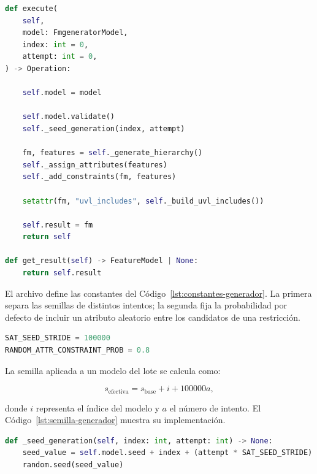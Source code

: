 \begin{lstlisting}[language=Python,
basicstyle=\ttfamily\footnotesize,breaklines=true,columns=fullflexible,
caption={Coordinación de la generación en \texttt{GenerateFeatureModel}.},
label={lst:execute-generador}]
def execute(
    self,
    model: FmgeneratorModel,
    index: int = 0,
    attempt: int = 0,
) -> Operation:

    self.model = model

    self.model.validate()
    self._seed_generation(index, attempt)

    fm, features = self._generate_hierarchy()
    self._assign_attributes(features)
    self._add_constraints(fm, features)

    setattr(fm, "uvl_includes", self._build_uvl_includes())

    self.result = fm
    return self

def get_result(self) -> FeatureModel | None:
    return self.result
\end{lstlisting}

El archivo define las constantes del Código~\ref{lst:constantes-generador}.
La primera separa las semillas de distintos intentos; la segunda fija la
probabilidad por defecto de incluir un atributo aleatorio entre los
candidatos de una restricción.

\begin{lstlisting}[language=Python,
basicstyle=\ttfamily\footnotesize,breaklines=true,columns=fullflexible,
caption={Constantes utilizadas para las semillas y los atributos aleatorios.},
label={lst:constantes-generador}]
SAT_SEED_STRIDE = 100000
RANDOM_ATTR_CONSTRAINT_PROB = 0.8
\end{lstlisting}

La semilla aplicada a un modelo del lote se calcula como:

\[
s_{\mathrm{efectiva}}=
s_{\mathrm{base}}+i+100000a,
\]

donde $i$ representa el índice del modelo y $a$ el número de intento.
El Código~\ref{lst:semilla-generador} muestra su implementación.

\begin{lstlisting}[language=Python,
basicstyle=\ttfamily\footnotesize,breaklines=true,columns=fullflexible,
caption={Cálculo de la semilla para cada modelo e intento.},
label={lst:semilla-generador}]
def _seed_generation(self, index: int, attempt: int) -> None:
    seed_value = self.model.seed + index + (attempt * SAT_SEED_STRIDE)
    random.seed(seed_value)
\end{lstlisting}

